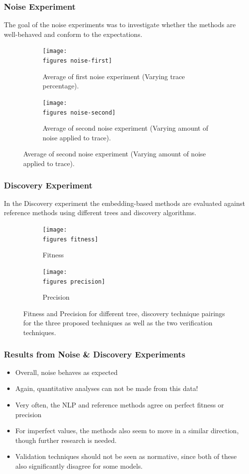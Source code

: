 \documentclass{beamer}
\newcommand{\figures}{../figures/}
\begin{document}
	
	\begin{frame}
		\frametitle{Noise Experiment}
		The goal of the noise experiments was to investigate whether the methods are well-behaved and conform to the expectations.
		\begin{figure}
			\centering
			\begin{subfigure}[b]{0.49\textwidth}
				\centering
				\texttt{[image: \\figures noise-first]}
				\caption{Average of first noise experiment (Varying trace percentage).}
				\label{fig:noise-first}
			\end{subfigure}
			\hfill
			\begin{subfigure}[b]{0.49\textwidth}
				\centering
				\texttt{[image: \\figures noise-second]}
				\caption{Average of second noise experiment (Varying amount of noise applied to trace).}
				\label{fig:noise-second}
			\end{subfigure}
		\end{figure}
	\end{frame}
	
	
	\begin{frame}
		\frametitle{Discovery Experiment}
		In the Discovery experiment the embedding-based methods are evaluated against reference methods using different trees and discovery algorithms.
		\begin{figure}
			\centering
			\begin{subfigure}[b]{0.49\textwidth}
				\centering
				\texttt{[image: \\figures fitness]}
				\caption{Fitness}
				\label{fig:fitness}
			\end{subfigure}
			\hfill
			\begin{subfigure}[b]{0.49\textwidth}
				\centering
				\texttt{[image: \\figures precision]}
				\caption{Precision}
				\label{fig:precision}
			\end{subfigure}
			\caption{Fitness and Precision for different tree, discovery technique pairings for the three proposed techniques as well as the two verification techniques.}
			\label{fig:discovery}
		\end{figure}
	\end{frame}
	
	\begin{frame}
		\frametitle{Results from Noise \& Discovery Experiments}
		\begin{itemize}
			\item Overall, noise behaves as expected
			\item Again, quantitative analyses can not be made from this data!
			\item Very often, the NLP and reference methods agree on perfect fitness or precision
			\item For imperfect values, the methods also seem to move in a similar direction, though further research is needed.
			\item Validation techniques should not be seen as normative, since both of these also significantly disagree for some models. 
		\end{itemize}
	\end{frame}
	
\end{document}
